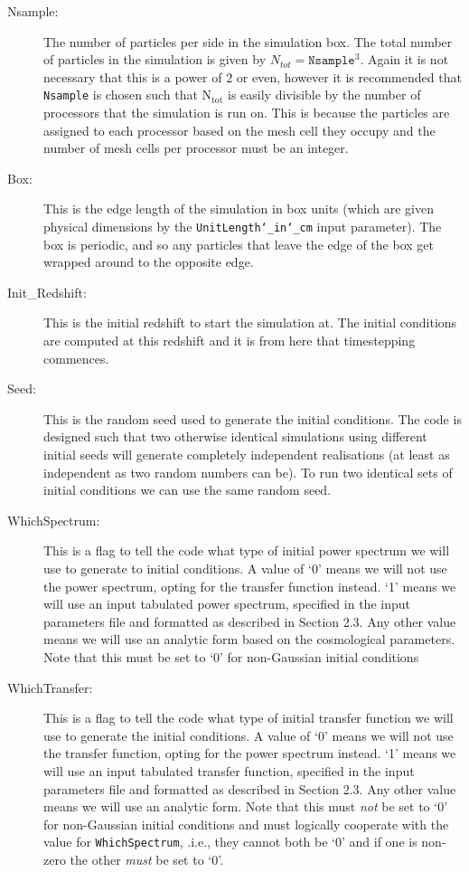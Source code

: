 \documentclass[12pt,twoside,a4paper]{article}
\begin{document}
\begin{description}
\item[Nsample:]{The number of particles per side in the simulation box. The total number of particles in the simulation is given by $N_{tot} = \texttt{Nsample}^{3}$. Again it is not necessary that this is a power of $2$ or even, however it is recommended that \texttt{Nsample} is chosen such that
$\text{N}_{\text{tot}}$ is easily divisible by the number of processors that the simulation is run on. This is because the particles are assigned to each processor based on the mesh cell they occupy and the number of mesh cells per processor must be an integer.}
\item[Box:]{This is the edge length of the simulation in box units (which are given physical dimensions by the \texttt{UnitLength\char`_in\char`_cm} input parameter). The box is periodic, and so any particles that leave the edge of the box get wrapped around to the opposite edge.}
\item[Init\_Redshift:]{This is the initial redshift to start the simulation at. The initial conditions are computed at this redshift and it is from here that timestepping commences.}
\item[Seed:]{This is the random seed used to generate the initial conditions. The code is designed such that two otherwise identical simulations using different initial seeds will generate completely independent realisations (at least as independent as two random numbers can be). To run two identical sets of initial conditions we can use the same random seed.}
\item[WhichSpectrum:]{This is a flag to tell the code what type of initial power spectrum we will use to generate to initial conditions. A value of `0' means we will not use the power spectrum, opting for the transfer function instead. `1' means we will use an input tabulated power spectrum, specified in the input parameters file and formatted as described in Section 2.3. Any other value means we will use an analytic form based on the cosmological parameters. Note that this must be set to `0' for non-Gaussian initial conditions}
\item[WhichTransfer:]{This is a flag to tell the code what type of initial transfer function we will use to generate the initial conditions. A value of `0' means we will not use the transfer function, opting for the power spectrum instead. `1' means we will use an input tabulated transfer function, specified in the input parameters file and formatted as described in Section 2.3. Any other value means we will use an analytic form. Note that this must \emph{not} be set to `0' for non-Gaussian initial conditions and must logically cooperate with the value for \texttt{WhichSpectrum}, .i.e., they cannot both be `0' and if one is non-zero the other \emph{must} be set to `0'.}

\end{description}
\end{document}
